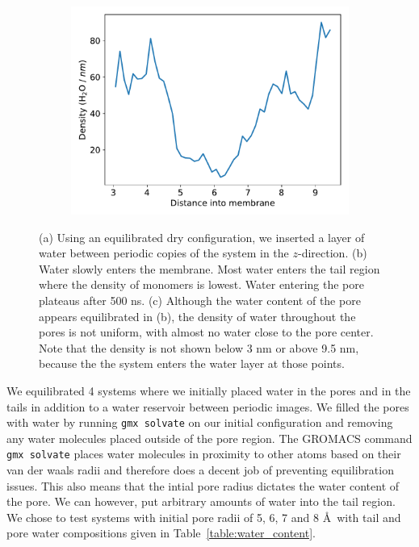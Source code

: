 \documentclass{article}
\begin{document}
\begin{figure}[!htb]
\begin{subfigure}{0.37\textwidth}
  \caption{}\label{fig:equilibrated_water_penetration}
  \end{subfigure}  
  \begin{subfigure}{0.37\textwidth}
  \includegraphics[width=\linewidth]{penetration_density.pdf}
  \caption{}\label{fig:penetration_density}
  \end{subfigure}  
  \caption{(a) Using an equilibrated dry configuration, we inserted a layer of water between
           periodic copies of the system in the $z$-direction. (b) Water slowly enters 
	   the membrane. Most water enters the tail region where the density of monomers is
	   lowest. Water entering the pore plateaus after 500 ns. (c) Although the water
	   content of the pore appears equilibrated in (b), the density of water throughout
	   the pores is not uniform, with almost no water close to the pore center. Note that
           the density is not shown below 3 nm or above 9.5 nm, because the the system
	   enters the water layer at those points.
  }\label{fig:gap_solvation}
  \end{figure}

  We equilibrated 4 systems where we initially placed water in the pores and in
  the tails in addition to a water reservoir between periodic images. We filled
  the pores with water by running \texttt{gmx solvate} on our initial
  configuration and removing any water molecules placed outside of the pore
  region. The GROMACS command \texttt{gmx solvate} places water molecules in
  proximity to other atoms based on their van der waals radii and therefore does
  a decent job of preventing equilibration issues. This also means that the
  intial pore radius dictates the water content of the pore. We can however, put
  arbitrary amounts of water into the tail region. We chose to test systems with
  initial pore radii of 5, 6, 7 and 8 \AA~with tail and pore water compositions
  given in Table~\ref{table:water_content}.
\end{document}
